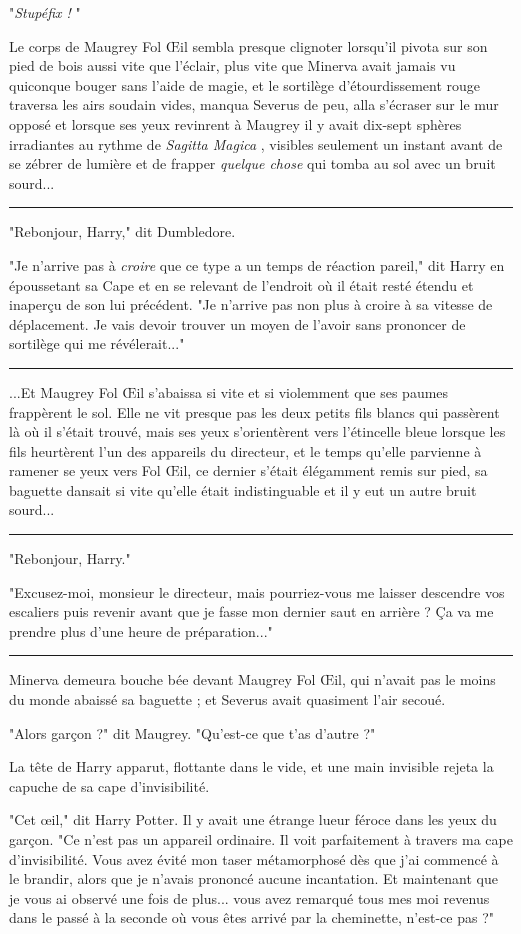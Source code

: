 "\emph{Stupéfix !} "

Le corps de Maugrey Fol Œil sembla presque clignoter lorsqu'il pivota sur son pied de bois aussi vite que l'éclair, plus vite que Minerva avait jamais vu quiconque bouger sans l'aide de magie, et le sortilège d'étourdissement rouge traversa les airs soudain vides, manqua Severus de peu, alla s'écraser sur le mur opposé et lorsque ses yeux revinrent à Maugrey il y avait dix-sept sphères irradiantes au rythme de \emph{Sagitta Magica} , visibles seulement un instant avant de se zébrer de lumière et de frapper \emph{quelque chose}  qui tomba au sol avec un bruit sourd...
\par\noindent\rule{\textwidth}{0.4pt}
"Rebonjour, Harry," dit Dumbledore.

"Je n'arrive pas à \emph{croire}  que ce type a un temps de réaction pareil," dit Harry en époussetant sa Cape et en se relevant de l'endroit où il était resté étendu et inaperçu de son lui précédent. "Je n'arrive pas non plus à croire à sa vitesse de déplacement. Je vais devoir trouver un moyen de l'avoir sans prononcer de sortilège qui me révélerait..."
\par\noindent\rule{\textwidth}{0.4pt}
...Et Maugrey Fol Œil s'abaissa si vite et si violemment que ses paumes frappèrent le sol. Elle ne vit presque pas les deux petits fils blancs qui passèrent là où il s'était trouvé, mais ses yeux s'orientèrent vers l'étincelle bleue lorsque les fils heurtèrent l'un des appareils du directeur, et le temps qu'elle parvienne à ramener se yeux vers Fol Œil, ce dernier s'était élégamment remis sur pied, sa baguette dansait si vite qu'elle était indistinguable et il y eut un autre bruit sourd...
\par\noindent\rule{\textwidth}{0.4pt}
"Rebonjour, Harry."

"Excusez-moi, monsieur le directeur, mais pourriez-vous me laisser descendre vos escaliers puis revenir avant que je fasse mon dernier saut en arrière ? Ça va me prendre plus d'une heure de préparation..."
\par\noindent\rule{\textwidth}{0.4pt}
Minerva demeura bouche bée devant Maugrey Fol Œil, qui n'avait pas le moins du monde abaissé sa baguette ; et Severus avait quasiment l'air secoué.

"Alors garçon ?" dit Maugrey. "Qu'est-ce que t'as d'autre ?"

La tête de Harry apparut, flottante dans le vide, et une main invisible rejeta la capuche de sa cape d'invisibilité.

"Cet œil," dit Harry Potter. Il y avait une étrange lueur féroce dans les yeux du garçon. "Ce n'est pas un appareil ordinaire. Il voit parfaitement à travers ma cape d'invisibilité. Vous avez évité mon taser métamorphosé dès que j'ai commencé à le brandir, alors que je n'avais prononcé aucune incantation. Et maintenant que je vous ai observé une fois de plus... vous avez remarqué tous mes moi revenus dans le passé à la seconde où vous êtes arrivé par la cheminette, n'est-ce pas ?"

